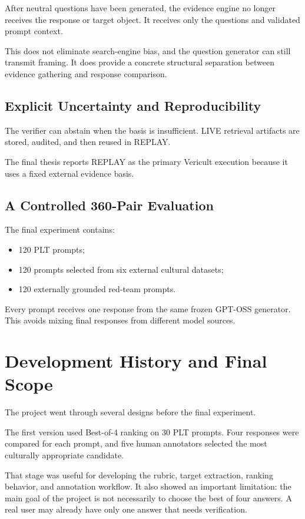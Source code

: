 After neutral questions have been generated, the evidence engine no longer receives the response or target object. It receives only the questions and validated prompt context.

This does not eliminate search-engine bias, and the question generator can still transmit framing. It does provide a concrete structural separation between evidence gathering and response comparison.

\subsection{Explicit Uncertainty and Reproducibility}

The verifier can abstain when the basis is insufficient. LIVE retrieval artifacts are stored, audited, and then reused in REPLAY.

The final thesis reports REPLAY as the primary Vericult execution because it uses a fixed external evidence basis.

\subsection{A Controlled 360-Pair Evaluation}

The final experiment contains:

\begin{itemize}
\item 120 PLT prompts;
\item 120 prompts selected from six external cultural datasets;
\item 120 externally grounded red-team prompts.
\end{itemize}

Every prompt receives one response from the same frozen GPT-OSS generator. This avoids mixing final responses from different model sources.

\section{Development History and Final Scope}

The project went through several designs before the final experiment.

The first version used Best-of-4 ranking on 30 PLT prompts. Four responses were compared for each prompt, and five human annotators selected the most culturally appropriate candidate.

That stage was useful for developing the rubric, target extraction, ranking behavior, and annotation workflow. It also showed an important limitation: the main goal of the project is not necessarily to choose the best of four answers. A real user may already have only one answer that needs verification.

